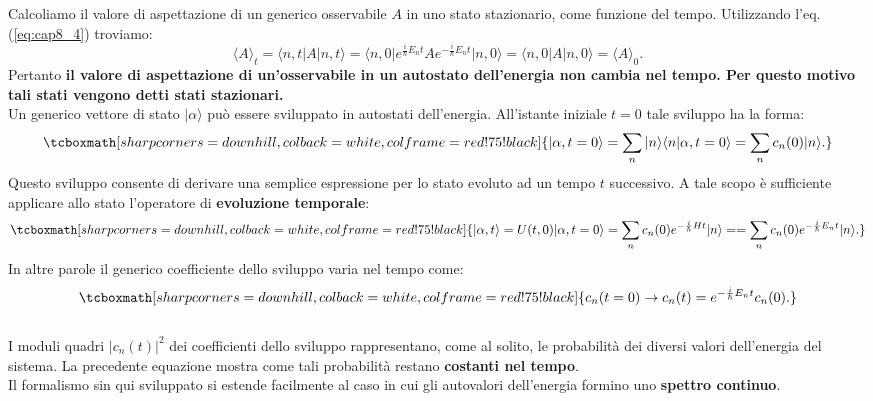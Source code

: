 \documentclass[a4paper,12pt,oneside]{book}
\begin{document}
Calcoliamo il valore di aspettazione di un generico osservabile $A$ in uno stato stazionario, come funzione del tempo. Utilizzando l'eq.(\ref{eq:cap8_4}) troviamo:
	\begin{equation}
		\langle A \rangle _t = \langle n, t \vert A \vert n, t \rangle= \langle n, 0 \vert e^{\frac{i}{\hbar}E_n t}A e^{-\frac{i}{\hbar}E_n t}\vert n, 0 \rangle =\langle n, 0 \vert A \vert n, 0 \rangle = \langle A \rangle _0.
	\end{equation}
Pertanto \textbf{il valore di aspettazione di un'osservabile in un autostato dell'energia non cambia nel tempo. Per questo motivo tali stati vengono detti stati stazionari.}\\

Un generico vettore di stato $\vert \alpha \rangle $ può essere sviluppato in autostati dell'energia. All'istante iniziale $t=0$ tale sviluppo ha la forma:
	\begin{equation}
		\tcboxmath[sharp corners=downhill, colback=white, colframe=red!75!black]{
			\vert \alpha , t=0\rangle = \sum _n \vert n \rangle \langle n \vert \alpha, t=0 \rangle = \sum _n c_n(0)\vert n \rangle.
			}
	\end{equation}
Questo sviluppo consente di derivare una semplice espressione per lo stato evoluto ad un tempo $t$ successivo. A tale scopo è sufficiente applicare allo stato l'operatore di \textbf{evoluzione temporale}:
	\begin{equation}
		\tcboxmath[sharp corners=downhill, colback=white, colframe=red!75!black]{
			\vert \alpha, t \rangle = U (t,0)\vert \alpha, t=0 \rangle = \sum _n c_n (0) e^{-\frac{i}{\hbar}H t}  \vert n \rangle =  =\sum _n c_n (0) e^{-\frac{i}{\hbar}E_n t}  \vert n \rangle.
			}
	\end{equation}
In altre parole il generico coefficiente dello sviluppo varia nel tempo come:
	\begin{equation}
		\tcboxmath[sharp corners=downhill, colback=white, colframe=red!75!black]{
			c_n (t=0) \rightarrow c_n(t)=e^{-\frac{i}{\hbar}E_n t} c_n (0).
			}
	\end{equation}\\
	
I moduli quadri $\vert c_n(t)\vert^2$ dei coefficienti dello sviluppo rappresentano, come al solito, le probabilità dei diversi valori dell'energia del sistema. La precedente equazione mostra come tali probabilità restano \textbf{costanti nel tempo}.\\

Il formalismo sin qui sviluppato si estende facilmente al caso in cui gli autovalori dell'energia formino uno \textbf{spettro continuo}.
\end{document}
